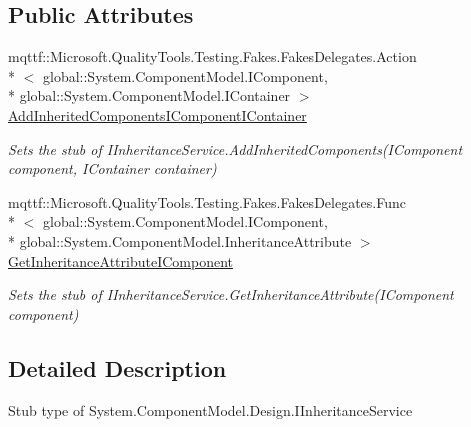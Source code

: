 \subsection*{Public Attributes}
\begin{DoxyCompactItemize}
\item 
mqttf\-::\-Microsoft.\-Quality\-Tools.\-Testing.\-Fakes.\-Fakes\-Delegates.\-Action\\*
$<$ global\-::\-System.\-Component\-Model.\-I\-Component, \\*
global\-::\-System.\-Component\-Model.\-I\-Container $>$ \hyperlink{class_system_1_1_component_model_1_1_design_1_1_fakes_1_1_stub_i_inheritance_service_ad5eb3924a63f8b06976b62583d4f07c9}{Add\-Inherited\-Components\-I\-Component\-I\-Container}
\begin{DoxyCompactList}\small\item\em Sets the stub of I\-Inheritance\-Service.\-Add\-Inherited\-Components(\-I\-Component component, I\-Container container)\end{DoxyCompactList}\item 
mqttf\-::\-Microsoft.\-Quality\-Tools.\-Testing.\-Fakes.\-Fakes\-Delegates.\-Func\\*
$<$ global\-::\-System.\-Component\-Model.\-I\-Component, \\*
global\-::\-System.\-Component\-Model.\-Inheritance\-Attribute $>$ \hyperlink{class_system_1_1_component_model_1_1_design_1_1_fakes_1_1_stub_i_inheritance_service_ab4d15c0a4d4ad4e7e9a3e68ca841fe91}{Get\-Inheritance\-Attribute\-I\-Component}
\begin{DoxyCompactList}\small\item\em Sets the stub of I\-Inheritance\-Service.\-Get\-Inheritance\-Attribute(\-I\-Component component)\end{DoxyCompactList}\end{DoxyCompactItemize}


\subsection{Detailed Description}
Stub type of System.\-Component\-Model.\-Design.\-I\-Inheritance\-Service




